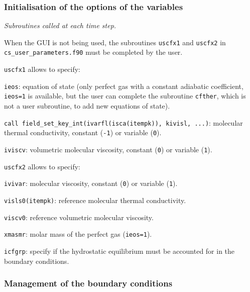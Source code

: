 {{{%
\subsubsection{ Initialisation of the options of the variables}
\label{prg_uscfx12}%
\noindent
\textit{Subroutines called at each time step.}

When the GUI is not being used, the subroutines \texttt{uscfx1} and \texttt{uscfx2} in \texttt{cs\_user\_parameters.f90}
must be completed by the user.

\texttt{uscfx1} allows to specify:
\begin{list}{-}{}
\item \texttt{ieos}: equation of state (only perfect gas with a constant adiabatic coefficient,
                      \texttt{ieos=1} is available, but the user can complete the subroutine
                      \texttt{cfther}, which is not a user subroutine, to add new equations of state).
\item \texttt{call field\_set\_key\_int(ivarfl(isca(itempk)), kivisl, ...)}: molecular thermal conductivity, constant (\texttt{-1}) or variable (\texttt{0}).
\item  \texttt{iviscv}: volumetric molecular viscosity, constant (\texttt{0}) or variable (\texttt{1}).
\end{list}

\texttt{uscfx2} allows to specify:
\begin{list}{-}{}
  \item \texttt{ivivar}: molecular viscosity, constant (\texttt{0}) or variable (\texttt{1}).
  \item \texttt{visls0(itempk)}: reference molecular thermal conductivity.
  \item \texttt{viscv0}: reference volumetric molecular viscosity.
  \item \texttt{xmasmr}: molar mass of the perfect gas (\texttt{ieos=1}).
  \item \texttt{icfgrp}: specify if the hydrostatic equilibrium must be accounted for in the
                         boundary conditions.
\end{list}

\subsubsection{Management of the boundary conditions}

}}}
